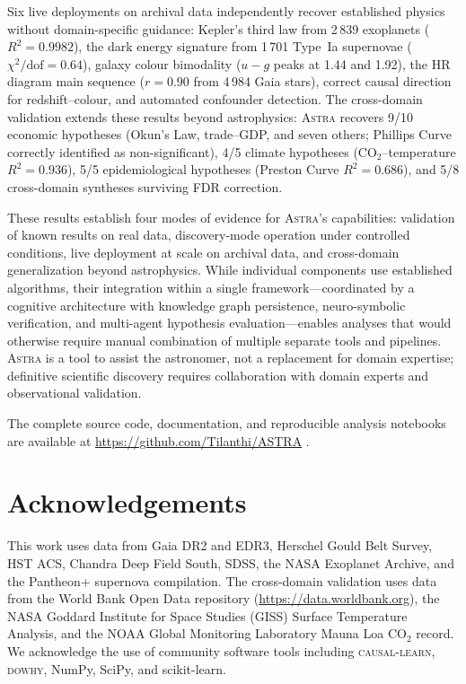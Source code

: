 \documentclass[usenatbib]{rasti}
\newcommand{\astra}{\textsc{Astra}\xspace}
\begin{document}
Six live deployments on archival data independently recover established physics without domain-specific guidance: Kepler's third law from 2\,839 exoplanets ($R^{2}=0.9982$), the dark energy signature from 1\,701 Type~Ia supernovae ($\chi^{2}/\mathrm{dof}=0.64$), galaxy colour bimodality ($u{-}g$ peaks at 1.44 and 1.92), the HR diagram main sequence ($r=0.90$ from 4\,984 Gaia stars), correct causal direction for redshift--colour, and automated confounder detection.
The cross-domain validation extends these results beyond astrophysics: \astra recovers 9/10 economic hypotheses (Okun's Law, trade--GDP, and seven others; Phillips Curve correctly identified as non-significant), 4/5 climate hypotheses (CO$_{2}$--temperature $R^{2}=0.936$), 5/5 epidemiological hypotheses (Preston Curve $R^{2}=0.686$), and 5/8 cross-domain syntheses surviving FDR correction.

These results establish four modes of evidence for \astra's capabilities: validation of known results on real data, discovery-mode operation under controlled conditions, live deployment at scale on archival data, and cross-domain generalization beyond astrophysics.
While individual components use established algorithms, their integration within a single framework---coordinated by a cognitive architecture with knowledge graph persistence, neuro-symbolic verification, and multi-agent hypothesis evaluation---enables analyses that would otherwise require manual combination of multiple separate tools and pipelines.
\astra is a tool to assist the astronomer, not a replacement for domain expertise; definitive scientific discovery requires collaboration with domain experts and observational validation.

The complete source code, documentation, and reproducible analysis notebooks are available at \url{https://github.com/Tilanthi/ASTRA} \citep{White2026}.

\section*{Acknowledgements}

This work uses data from Gaia DR2 and EDR3, Herschel Gould Belt Survey, HST ACS, Chandra Deep Field South, SDSS, the NASA Exoplanet Archive, and the Pantheon+ supernova compilation.
The cross-domain validation uses data from the World Bank Open Data repository (\url{https://data.worldbank.org}), the NASA Goddard Institute for Space Studies (GISS) Surface Temperature Analysis, and the NOAA Global Monitoring Laboratory Mauna Loa CO$_{2}$ record.
We acknowledge the use of community software tools including \textsc{causal-learn}, \textsc{dowhy}, NumPy, SciPy, and scikit-learn.
\end{document}
